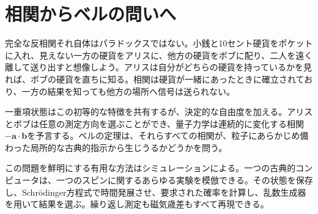 \begin{classroomqa}
\end{classroomqa}

\section{相関からベルの問いへ}

完全な反相関それ自体はパラドックスではない。小銭と10セント硬貨をポケットに入れ、見えない一方の硬貨をアリスに、他方の硬貨をボブに配り、二人を遠く離して送り出すと想像しよう。アリスは自分がどちらの硬貨を持っているかを見れば、ボブの硬貨を直ちに知る。相関は硬貨が一緒にあったときに確立されており、一方の結果を知っても他方の場所へ信号は送られない。

一重項状態はこの初等的な特徴を共有するが、決定的な自由度を加える。アリスとボブは任意の測定方向を選ぶことができ、量子力学は連続的に変化する相関\(-\bm a\cdot\bm b\)を予言する。ベルの定理は、それらすべての相関が、粒子にあらかじめ備わった局所的な古典的指示から生じうるかどうかを問う。

\begin{classroomqa}
\end{classroomqa}

\begin{classroomqa}
\end{classroomqa}

この問題を鮮明にする有用な方法はシミュレーションによる。一つの古典的コンピュータは、一つのスピンに関するあらゆる実験を模倣できる。その状態を保存し、Schr\"odinger方程式で時間発展させ、要求された確率を計算し、乱数生成器を用いて結果を選ぶ。繰り返し測定も磁気歳差もすべて再現できる。

